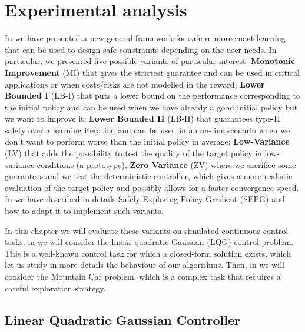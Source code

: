 \chapter{Experimental analysis}
\label{ch:experim}
\thispagestyle{empty}

\fancyhead[LE,RO]{\bfseries\thepage}                               
\fancyhead[RE]{\bfseries\leftmark}    
\fancyhead[LO]{\bfseries\rightmark}  

In  we have presented a new general framework for safe reinforcement learning that can be used to design safe constraints depending on the user needs. In particular, we presented five possible variants of particular interest: \textbf{Monotonic Improvement} (MI) that gives the strictest guarantee and can be used in critical applications or when costs/risks are not modelled in the reward; \textbf{Lower Bounded I} (LB-I) that puts a lower bound on the performance corresponding to the initial policy and can be used when we have already a good initial policy but we want to improve it; \textbf{Lower Bounded II} (LB-II) that guarantees type-II safety over a learning iteration and can be used in an on-line scenario when we don't want to perform worse than the initial policy in average; \textbf{Low-Variance} (LV) that adds the possibility to test the quality of the target policy in low-variance conditions (\eg a prototype); \textbf{Zero Variance} (ZV) where we sacrifice some guarantees and we test the deterministic controller, which gives a more realistic evaluation of the target policy and possibly allows for a faster convergence speed.\\
In  we have described in details Safely-Exploring Policy Gradient (SEPG) and how to adapt it to implement such variants.


In this chapter we will evaluate these variants on simulated continuous control tasks: in  we will consider the linear-quadratic Gaussian (LQG) control problem. This is a well-known control task for which a closed-form solution exists, which let us study in more details the behaviour of our algorithms. Then, in  we will consider the Mountain Car problem, which is a complex task that requires a careful exploration strategy. 


\section{Linear Quadratic Gaussian Controller}\label{sec:lqg}


